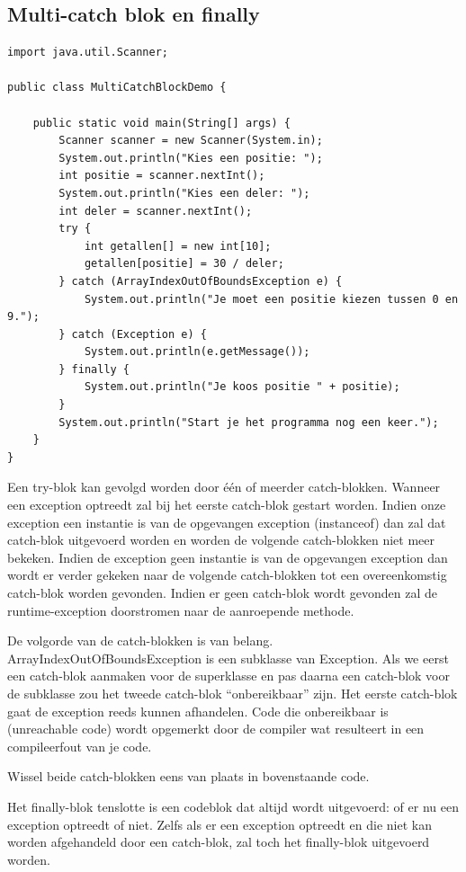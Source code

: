 \begin{itemize}
{\section{Multi-catch blok en finally}

\begin{lstlisting}
import java.util.Scanner;

public class MultiCatchBlockDemo {

	public static void main(String[] args) {
		Scanner scanner = new Scanner(System.in);
		System.out.println("Kies een positie: ");
		int positie = scanner.nextInt();
		System.out.println("Kies een deler: ");
		int deler = scanner.nextInt();
		try {
			int getallen[] = new int[10];
			getallen[positie] = 30 / deler;
		} catch (ArrayIndexOutOfBoundsException e) {
			System.out.println("Je moet een positie kiezen tussen 0 en 9.");
		} catch (Exception e) {
			System.out.println(e.getMessage());
		} finally {
			System.out.println("Je koos positie " + positie);
		}
		System.out.println("Start je het programma nog een keer.");
	}
}
\end{lstlisting}

Een try-blok kan gevolgd worden door \'e\'en of meerder catch-blokken.
Wanneer een exception optreedt zal bij het eerste catch-blok gestart worden. Indien onze exception een instantie is van de opgevangen exception  (instanceof) dan zal dat catch-blok uitgevoerd worden en worden de volgende catch-blokken niet meer bekeken. Indien de exception geen instantie is van de opgevangen exception dan wordt er verder gekeken naar de volgende catch-blokken tot een overeenkomstig catch-blok worden gevonden. Indien er geen catch-blok wordt gevonden zal de runtime-exception doorstromen naar de aanroepende methode.

De volgorde van de catch-blokken is van belang. ArrayIndexOutOfBoundsException is een subklasse van Exception. Als we eerst een catch-blok aanmaken voor de superklasse en pas daarna een catch-blok voor de subklasse zou het tweede catch-blok ``onbereikbaar'' zijn. Het eerste catch-blok gaat de exception reeds kunnen afhandelen. Code die onbereikbaar is (unreachable code) wordt opgemerkt door de compiler wat resulteert in een compileerfout van je code.

\begin{oefening}
Wissel beide catch-blokken eens van plaats in bovenstaande code.
\end{oefening}

Het finally-blok tenslotte is een codeblok dat altijd wordt uitgevoerd: of er nu een exception optreedt of niet. Zelfs als er een exception optreedt en die niet kan worden afgehandeld door een catch-blok, zal toch het finally-blok uitgevoerd worden.

}
\end{itemize}
